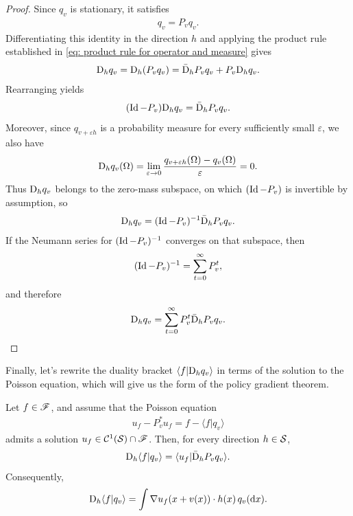 \documentclass[twoside,10pt]{../jmlr}
\begin{document}
\begin{proof}
    Since $q_v$ is stationary, it satisfies
    \begin{align}
        q_v=P_v q_v.
    \end{align}
    Differentiating this identity in the direction $h$ and applying the product rule established in \eqref{eq: product rule for operator and measure} gives
    \begin{align}
        \mathrm{D}_h q_v=\mathrm{D}_h(P_v q_v)=\bar{\mathrm{D}}_h P_v q_v+P_v\mathrm{D}_h q_v.
    \end{align}
    Rearranging yields
    \begin{align}
        (\operatorname{Id}-P_v)\mathrm{D}_h q_v=\bar{\mathrm{D}}_h P_v q_v.
    \end{align}
    Moreover, since $q_{v+\varepsilon h}$ is a probability measure for every sufficiently small $\varepsilon$, we also have
    \begin{align}
        \mathrm{D}_h q_v(\Omega)=\lim_{\varepsilon\to 0}\frac{q_{v+\varepsilon h}(\Omega)-q_v(\Omega)}{\varepsilon}=0.
    \end{align}
    Thus $\mathrm{D}_h q_v$ belongs to the zero-mass subspace, on which $(\operatorname{Id}-P_v)$ is invertible by assumption, so
    \begin{align}
        \mathrm{D}_h q_v=(\operatorname{Id}-P_v)^{-1}\bar{\mathrm{D}}_h P_v q_v.
    \end{align}
    If the Neumann series for $(\operatorname{Id}-P_v)^{-1}$ converges on that subspace, then
    \begin{align}
        (\operatorname{Id}-P_v)^{-1}=\sum_{t=0}^\infty P_v^t,
    \end{align}
    and therefore
    \begin{align}
        \mathrm{D}_h q_v=\sum_{t=0}^\infty P_v^t\bar{\mathrm{D}}_h P_v q_v.
    \end{align}
\end{proof}

Finally, let's rewrite the duality bracket $\langle f\vert \mathrm{D}_h q_v\rangle$ in terms of the solution to the Poisson equation, which will give us the form of the policy gradient theorem.

\begin{lemma}\label{lemma: poisson representation of derivative of q_v}
    Let $f\in\mathscr{F}$, and assume that the Poisson equation
    \begin{align}
        u_f-P_v^*u_f=f-\langle f\vert q_v\rangle
    \end{align}
    admits a solution $u_f\in\mathcal{C}^1(\mathcal{S})\cap\mathscr{F}$. Then, for every direction $h\in\mathcal{S}$,
    \begin{align}
        \mathrm{D}_h\langle f\vert q_v\rangle=\langle u_f\vert \bar{\mathrm{D}}_h P_v q_v\rangle.
    \end{align}
    Consequently, 
    \begin{align}
        \mathrm{D}_h\langle f\vert q_v\rangle=\int \nabla u_f(x+v(x))\cdot h(x)\,q_v(\mathrm{d} x).
    \end{align}
\end{lemma}
\end{document}

